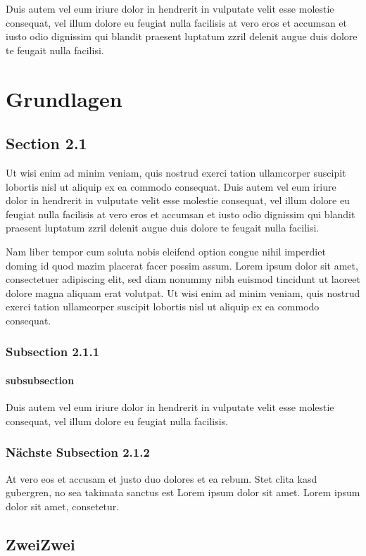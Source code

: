 \documentclass[a4paper, 12pt]{report}
\begin{document}
	Duis autem vel eum iriure dolor in hendrerit in vulputate velit esse molestie consequat, vel illum dolore eu feugiat nulla facilisis at vero eros et accumsan et iusto odio dignissim qui blandit praesent luptatum zzril delenit augue duis dolore te feugait nulla facilisi.  
	
	\chapter{Grundlagen}
	\section{Section 2.1} %
	Ut wisi enim ad minim veniam, quis nostrud exerci tation ullamcorper suscipit lobortis nisl ut aliquip ex ea commodo consequat. Duis autem vel eum iriure dolor in hendrerit in vulputate velit esse molestie consequat, vel illum dolore eu feugiat nulla facilisis at vero eros et accumsan et iusto odio dignissim qui blandit praesent luptatum zzril delenit augue duis dolore te feugait nulla facilisi.   
	
	Nam liber tempor cum soluta nobis eleifend option congue nihil imperdiet doming id quod mazim placerat facer possim assum. Lorem ipsum dolor sit amet, consectetuer adipiscing elit, sed diam nonummy nibh euismod tincidunt ut laoreet dolore magna aliquam erat volutpat. Ut wisi enim ad minim veniam, quis nostrud exerci tation ullamcorper suscipit lobortis nisl ut aliquip ex ea commodo consequat.   
	
	\subsection{Subsection 2.1.1} %
	\subsubsection{subsubsection} 
	Duis autem vel eum iriure dolor in hendrerit in vulputate velit esse molestie consequat, vel illum dolore eu feugiat nulla facilisis.   
	
	\subsection{Nächste Subsection 2.1.2} %
	At vero eos et accusam et justo duo dolores et ea rebum. Stet clita kasd gubergren, no sea takimata sanctus est Lorem ipsum dolor sit amet. Lorem ipsum dolor sit amet, consetetur.
	
	\section{ZweiZwei}
\end{document}
